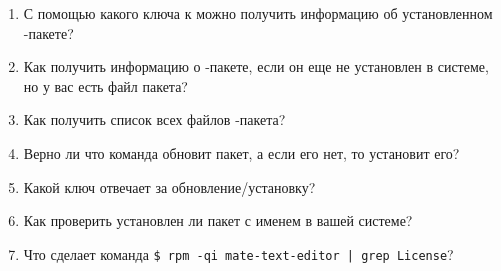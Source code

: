 \begin{enumerate}
	\item С помощью какого ключа к  можно получить информацию об установленном -пакете?
	\item Как получить информацию о -пакете, если он еще не установлен в системе, но у вас есть файл пакета?
	\item Как получить список всех файлов -пакета?
	\item Верно ли что команда  обновит пакет, а если его нет, то установит его?
	\item Какой ключ отвечает за обновление/установку?
	\item Как проверить установлен ли пакет с именем  в вашей системе?
	\item Что сделает команда \verb!$ rpm -qi mate-text-editor | grep License!?
\end{enumerate}
